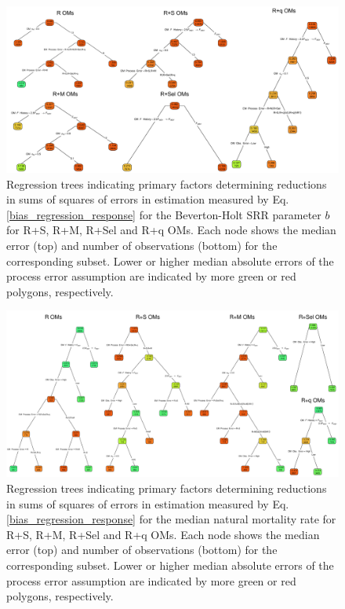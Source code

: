 \documentclass[
  12pt,
]{article}
\begin{document}
\begin{landscape}
\begin{figure}
\begin{center}
\includegraphics[width = 1.4\textwidth]{SR_b_bias_regtree_plots}
\end{center}
\caption{Regression trees indicating primary factors determining reductions in sums of squares of errors in estimation measured by Eq. \ref{bias_regression_response} for the Beverton-Holt SRR parameter $b$ for R+S, R+M, R+Sel and R+q OMs. Each node shows the median error (top) and number of observations (bottom) for the corresponding subset. Lower or higher median absolute errors of the process error assumption are indicated by more green or red polygons, respectively.}\label{SR_b_bias_regtree}
\end{figure}
\end{landscape}

\begin{landscape}
\begin{figure}
\begin{center}
\includegraphics[width = 1.4\textwidth]{med_M_bias_regtree_plots}
\end{center}
\caption{Regression trees indicating primary factors determining reductions in sums of squares of errors in estimation measured by Eq. \ref{bias_regression_response} for the median natural mortality rate for R+S, R+M, R+Sel and R+q OMs. Each node shows the median error (top) and number of observations (bottom) for the corresponding subset. Lower or higher median absolute errors of the process error assumption are indicated by more green or red polygons, respectively.}\label{med_M_bias_regtree}
\end{figure}
\end{landscape}
\end{document}
